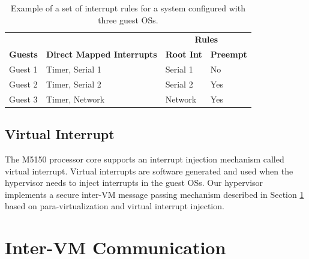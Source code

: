 \begin{table}[!hbtp]
\caption{Example of a set of interrupt rules for a system configured with three guest OSs.}
\label{table:rules}
\centering
\begin{tabular}{llll}
\hline
                                    &                                                       & \multicolumn{2}{c}{\textbf{Rules}}                                           \\ 
\multicolumn{1}{c}{\textbf{Guests}} & \multicolumn{1}{c}{\textbf{Direct Mapped Interrupts}} & \multicolumn{1}{c}{\textbf{Root Int}} & \multicolumn{1}{c}{\textbf{Preempt}} \\ \hline
Guest 1                               & Timer, Serial 1                                       & Serial 1                              & No                                   \\
Guest 2                              & Timer, Serial 2                                               & Serial 2                                  & Yes                                    \\
Guest 3                              & Timer, Network                               & Network                               & Yes                                    \\ \hline
\end{tabular}
\end{table}


\subsection{Virtual Interrupt}
\label{section5:virtual_interrupt}

The M5150 processor core supports an interrupt injection mechanism called virtual interrupt. Virtual interrupts are software generated and used when the hypervisor needs to inject interrupts in the guest OSs. Our hypervisor implements a secure inter-VM message passing mechanism described in Section \ref{chapter5:inter-vm} based on para-virtualization and virtual interrupt injection. 


\section{Inter-VM Communication}
\label{chapter5:inter-vm}

